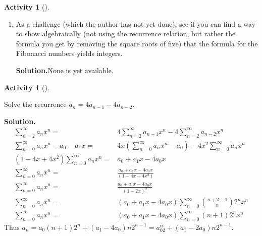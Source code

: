 \documentclass[10pt,]{book}
\theoremstyle{plain}
\theoremstyle{definition}
\newtheorem{activity}[project]{Activity}
\numberwithin{equation}{chapter}
\newcommand{\amp}{&}
\begin{document}
\begin{activity}[]
\begin{enumerate}[label=(\alph*)]
~\par
\item As a challenge (which the author has not yet done), see if you can find a way to show algebraically (not using the recurrence relation, but rather the formula you get by removing the square roots of five) that the formula for the Fibonacci numbers yields integers.%
\par\medskip\noindent%
\textbf{Solution.}\quad None is yet available.%

\end{enumerate}
\end{activity}
\begin{activity}[]\label{activity-210}
\item Solve the recurrence \(a_n= 4a_{n-1} - 4a_{n-2}\).%
\par\medskip\noindent%
\textbf{Solution.}\quad %
\begin{align*}
\sum_{n=2}^\infty a_nx^n  =\amp  4\sum_{n=2}^\infty a_{n-1}x^n -
4\sum_{n=2}^\infty a_{n-2}x^n\\
\sum_{n=0}^\infty a_nx^n -a_0-a_1x  =\amp  4x(\sum_{n=0}^\infty a_{n}x^n
-a_0) - 4x^2\sum_{n=0}^\infty a_{n}x^n\\
(1-4x+4x^2)\sum_{n=0}^\infty a_nx^n   =\amp
a_0+a_1x-4a_0x\\
\sum_{n=0}^\infty a_nx^n =\amp \frac{a_0+a_1x-4a_0x}{(1-4x+4x^2)}\\
\sum_{n=0}^\infty a_nx^n =\amp \frac{a_0+a_1x-4a_0x}{(1-2x)^2}\\
\sum_{n=0}^\infty a_nx^n =\amp (a_0+a_1x-4a_0x)\sum_{n=0}^\infty \binom{n+2-1}{n}
2^nx^n\\
\sum_{n=0}^\infty a_nx^n =\amp (a_0+a_1x-4a_0x)\sum_{n=0}^\infty (n+1)
2^nx^n
\end{align*}
Thus \(a_n=a_0(n+1)2^n
+(a_1-4a_0)n2^{n-1}=a_02^n+(a_1-2a_0)n2^{n-1}\).%
\end{activity}
\typeout{************************************************}
\typeout{************************************************}
\end{document}
